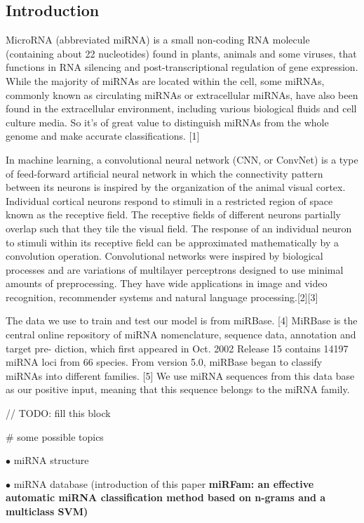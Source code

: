 \documentclass[letterpaper, 11pt]{article}
\begin{document}
\begin{multicols*}{2}
\section{Introduction}
{
MicroRNA (abbreviated miRNA) is a small non-coding RNA molecule (containing about 22 nucleotides) found in plants, animals and some viruses, that functions in RNA silencing and post-transcriptional regulation of gene expression. While the majority of miRNAs are located within the cell, some miRNAs, commonly known as circulating miRNAs or extracellular miRNAs, have also been found in the extracellular environment, including various biological fluids and cell culture media. So it's of great value to distinguish miRNAs from the whole genome and make accurate classifications. [1] 

In machine learning, a convolutional neural network (CNN, or ConvNet) is a type of feed-forward artificial neural network in which the connectivity pattern between its neurons is inspired by the organization of the animal visual cortex. Individual cortical neurons respond to stimuli in a restricted region of space known as the receptive field. The receptive fields of different neurons partially overlap such that they tile the visual field. The response of an individual neuron to stimuli within its receptive field can be approximated mathematically by a convolution operation. Convolutional networks were inspired by biological processes and are variations of multilayer perceptrons designed to use minimal amounts of preprocessing. They have wide applications in image and video recognition, recommender systems and natural language processing.[2][3]

The data we use to train and test our model is from miRBase. [4] MiRBase is the central online repository of miRNA nomenclature, sequence data, annotation and target pre- diction, which first appeared in Oct. 2002 Release 15 contains 14197 miRNA loci from 66 species. From version 5.0, miRBase began to classify miRNAs into different families. [5] We use miRNA sequences from this data base as our positive input, meaning that this sequence belongs to the miRNA family. 

// TODO: fill this block

\# some possible topics

$\bullet$ miRNA structure

$\bullet$ miRNA database (introduction of this paper \textbf{miRFam: an effective automatic miRNA classification method based on n-grams and a multiclass SVM)}

}
\end{multicols*}
\end{document}
